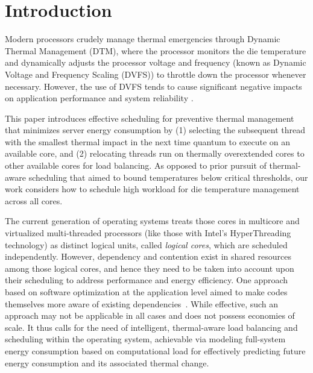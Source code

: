 \documentclass[times, 10pt,twocolumn]{IEEEtran}
\begin{document}
\section{Introduction}
\label{sec:Introduction}
Modern processors crudely manage thermal emergencies through Dynamic
Thermal Management (DTM), where the processor monitors the die
temperature and dynamically adjusts the processor voltage and frequency
(known as Dynamic Voltage and Frequency Scaling (DVFS))
to throttle down the processor whenever necessary. However, the use of
DVFS tends to cause significant negative impacts on application performance
and system reliability \cite{Donald2006,Bircher2008,Coskun2008d}.

This paper introduces effective scheduling for preventive thermal
management that minimizes server energy consumption by (1) 
selecting the subsequent thread with the smallest thermal impact
in the next time quantum to execute on an available core, and (2)
relocating threads run on thermally overextended cores
to other available cores for load balancing.
As opposed to prior pursuit of thermal-aware
scheduling \cite{Gomaa2004,Choi2007,Yang2008,Sarood2011} that 
aimed to bound temperatures below critical thresholds, our work considers
how to schedule high workload for die temperature management across all cores.

The current generation of operating systems treats those cores in
multicore and virtualized multi-threaded processors (like those with
Intel's HyperThreading technology) as distinct logical units, called
\textit{logical cores}, which are scheduled independently.  However,
dependency and contention exist in shared resources among those logical
cores, and hence they need to be taken into account upon their
scheduling to address performance and energy efficiency.  One approach
based on software optimization at the application level aimed to make
codes themselves more aware of existing dependencies~\cite{Khan2011}.
While effective, such an approach may not be applicable in all cases and
does not possess economies of scale.  It thus calls for the need of
intelligent, thermal-aware load balancing and scheduling within the
operating system, achievable via modeling full-system energy consumption
based on computational load for effectively predicting future energy
consumption and its associated thermal change.
\end{document}
